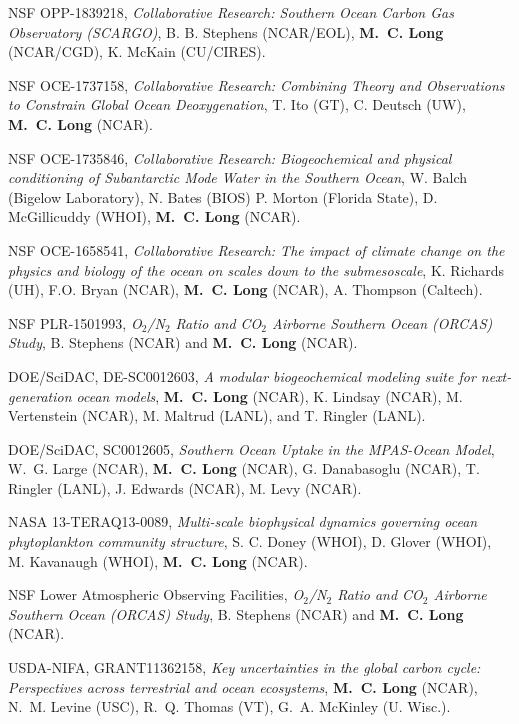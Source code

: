 \documentclass[11pt]{article}
\begin{document}
\begin{description}[style=multiline,leftmargin=2.5cm,font=\normalfont]
\item[2019--2022] NSF OPP-1839218,
\textit{Collaborative Research: Southern Ocean Carbon Gas Observatory (SCARGO)},
B. B. Stephens (NCAR/EOL), \textbf{M.~C. Long} (NCAR/CGD), K. McKain (CU/CIRES).

\item[2017--2020] NSF OCE-1737158,
\textit{Collaborative Research: Combining Theory and Observations to Constrain Global Ocean Deoxygenation},
T. Ito (GT), C. Deutsch (UW), \textbf{M.~C. Long} (NCAR).

\item[2017-2020] NSF OCE-1735846,
\textit{Collaborative Research: Biogeochemical and physical conditioning of Subantarctic Mode Water in the Southern Ocean},
W. Balch (Bigelow Laboratory), N. Bates (BIOS) P. Morton (Florida State),  D. McGillicuddy (WHOI), \textbf{M.~C. Long} (NCAR).

\item[2017-2020] NSF OCE-1658541,
\textit{Collaborative Research: The impact of climate change on the physics and biology of the ocean on scales down to the submesoscale},
K. Richards (UH), F.O. Bryan (NCAR), \textbf{M.~C. Long} (NCAR), A. Thompson (Caltech).

\item[2015--2017] NSF PLR-1501993,
\textit{O$_2$/N$_2$ Ratio and CO$_2$ Airborne Southern Ocean (ORCAS) Study},
B. Stephens (NCAR) and \textbf{M.~C. Long} (NCAR).

\item[2014--2017] DOE/SciDAC, DE-SC0012603,
\textit{A modular biogeochemical modeling suite for next-generation ocean models},
\textbf{M.~C. Long} (NCAR), K. Lindsay (NCAR), M. Vertenstein (NCAR), M. Maltrud (LANL), and T. Ringler (LANL).

\item[2014--2017] DOE/SciDAC, SC0012605,
\textit{Southern Ocean Uptake in the MPAS-Ocean Model},
W.~G. Large (NCAR), \textbf{M.~C. Long} (NCAR), G. Danabasoglu (NCAR), T. Ringler (LANL), J. Edwards (NCAR), M. Levy (NCAR).

\item[2014--2017] NASA 13-TERAQ13-0089,
\textit{Multi-scale biophysical dynamics governing ocean phytoplankton community structure},
S. C. Doney (WHOI), D. Glover (WHOI), M. Kavanaugh (WHOI),
\textbf{M.~C. Long} (NCAR).

\item[2014--2015] NSF Lower Atmospheric Observing Facilities,
\textit{O$_2$/N$_2$ Ratio and CO$_2$ Airborne Southern Ocean (ORCAS) Study},
B. Stephens (NCAR) and \textbf{M.~C. Long} (NCAR).

\item[2013--2014] USDA-NIFA, GRANT11362158,
\textit{Key uncertainties in the global carbon cycle: Perspectives across terrestrial and ocean ecosystems},
\textbf{M.~C. Long} (NCAR), N.~M. Levine (USC), R.~Q. Thomas (VT), G.~A. McKinley (U. Wisc.).

\end{description}
\end{document}
